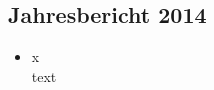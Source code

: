 \subsection{Jahresbericht 2014}
\begin{history}


    \begin{itemize}

        \item[]x\\
        text

    \end{itemize}

\end{history}
